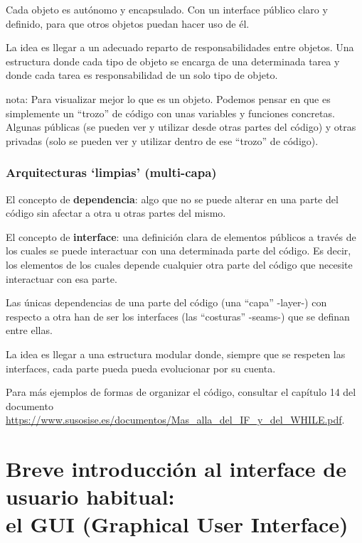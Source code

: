 \documentclass[spanish,12pt,a4paper,final,oneside]{book}
\begin{document}
Cada objeto es autónomo y encapsulado. Con un interface público claro y definido, para que otros objetos puedan hacer uso de él.

La idea es llegar a un adecuado reparto de responsabilidades entre objetos. Una estructura donde cada tipo de objeto se encarga de una determinada tarea y donde cada tarea es responsabilidad de un solo tipo de objeto.

\vspace{0.5cm}
nota: Para visualizar mejor lo que es un objeto. Podemos pensar en que es simplemente un ``trozo'' de código con unas variables y funciones concretas. Algunas públicas (se pueden ver y utilizar desde otras partes del código) y otras privadas (solo se pueden ver y utilizar dentro de ese ``trozo'' de código).


\subsection{Arquitecturas `limpias' (multi-capa)}

El concepto de \textbf{dependencia}: algo que no se puede alterar en una parte del código sin afectar a otra u otras partes del mismo.

El concepto de \textbf{interface}: una definición clara de elementos públicos a través de los cuales se puede interactuar con una determinada parte del código. Es decir, los elementos de los cuales depende cualquier otra parte del código que necesite interactuar con esa parte.

Las únicas dependencias de una parte del código (una ``capa'' -layer-) con respecto a otra han de ser los interfaces (las ``costuras'' -seams-) que se definan entre ellas.

La idea es llegar a una estructura modular donde, siempre que se respeten las interfaces, cada parte pueda pueda evolucionar por su cuenta.
 




\vfill
Para más ejemplos de formas de organizar el código, consultar el capítulo 14 del documento \url{https://www.susosise.es/documentos/Mas_alla_del_IF_y_del_WHILE.pdf}.


\chapter{Breve introducción al interface de usuario habitual: \\el GUI (Graphical User Interface)}
\end{document}
